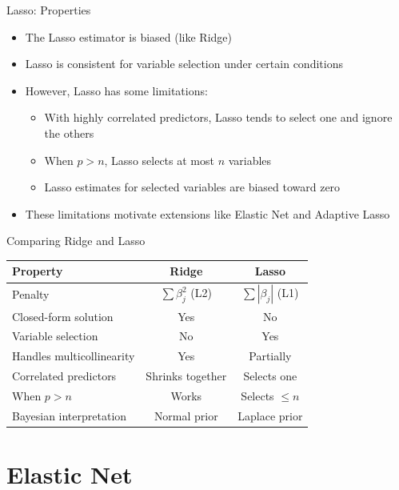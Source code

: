 \documentclass[aspectratio=169]{beamer}
\begin{document}
\begin{frame}{Lasso: Properties}
\begin{itemize}
    \item The Lasso estimator is biased (like Ridge)
    \item Lasso is consistent for variable selection under certain conditions
    \item However, Lasso has some limitations:
    \begin{itemize}
        \item With highly correlated predictors, Lasso tends to select one and ignore the others
        \item When $p > n$, Lasso selects at most $n$ variables
        \item Lasso estimates for selected variables are biased toward zero
    \end{itemize}
    \item These limitations motivate extensions like Elastic Net and Adaptive Lasso
\end{itemize}
\end{frame}

\begin{frame}{Comparing Ridge and Lasso}
\begin{center}
\begin{tabular}{l|c|c}
\hline
Property & Ridge & Lasso \\
\hline
Penalty & $\sum \beta_j^2$ (L2) & $\sum |\beta_j|$ (L1) \\
Closed-form solution & Yes & No \\
Variable selection & No & Yes \\
Handles multicollinearity & Yes & Partially \\
Correlated predictors & Shrinks together & Selects one \\
When $p > n$ & Works & Selects $\leq n$ \\
Bayesian interpretation & Normal prior & Laplace prior \\
\hline
\end{tabular}
\end{center}
\end{frame}

\section{Elastic Net}
\end{document}
